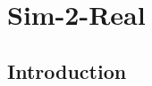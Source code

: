 \chapter{Sim-2-Real}
\label{cha:sim2real}

\begin{chapterabstract}
    \lipsum[2]
\end{chapterabstract}

\clearpage

\section{Introduction}
\label{cha:sim2real:sec:introduction}
